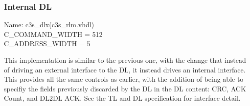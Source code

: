 \subsubsection{Internal DL}
Name: c3s\_dlx(c3s\_rlm.vhdl) \\
C\_COMMAND\_WIDTH = 512 \\
C\_ADDRESS\_WIDTH = 5

This implementation is similar to the previous one, with the change
that instead of driving an external interface to the DL, it instead
drives an internal interface. This provides all the same controls as
earlier, with the addition of being able to specifiy the fields
previously discarded by the DL in the DL content: CRC, ACK Count, and
DL2DL ACK. See the TL and DL specification for interface detail.
